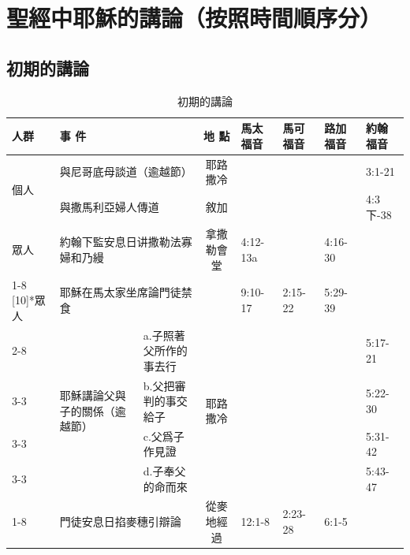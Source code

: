  \section{聖經中耶穌的講論（按照時間順序分）}
 
 \subsection{初期的講論}
 \begin{table}[htbp]
  \centering

    \begin{tabular}{p{2.43em}|p{3.93em}|p{11.53em}|c|p{4.045em}|p{4.045em}|p{4.045em}|p{4.045em}}
    \toprule
    人群    & \multicolumn{2}{p{16.5em}|}{事 件} & 地 點 & 馬太福音 & 馬可福音 & 路加福音 & 約翰福音 \\    \midrule

\multirow{2}{*}{個人} & \multicolumn{2}{p{13.5em}|}{與尼哥底母談道（逾越節）} & 耶路撒冷 &       &       &       & 3:1-21 \\
    
\cmidrule{2-8}       & \multicolumn{2}{p{11.5em}|}{與撒馬利亞婦人傳道} & 敘加 &       &       &       & 4:3下-38 \\ \midrule


\multirow{1}{*}{眾人}&\multicolumn{2}{p{16.5em}|}{約翰下監安息日讲撒勒法寡婦和乃縵} & 拿撒勒會堂 &4:12-13a&&4:16-30&\\\hline

\cmidrule{1-8}   \multirow{6}[10]{*}{眾人} & \multicolumn{2}{p{13.15em}|}{耶穌在馬太家坐席論門徒禁食} &       & 9:10-17 & 2:15-22 & 5:29-39 &  \\

\cmidrule{2-8}          & \multirow{4}{*}{\parbox{0.08\textwidth}{耶穌講論父與子的關係（逾越節）}} & a.子照著父所作的事去行 & \multirow{4}{*}{耶路撒冷} &       &       &       & 5:17-21 \\

\cmidrule{3-3}\cmidrule{5-8}      &       & b.父把審判的事交給子 &       &       &       &       & 5:22-30 \\
\cmidrule{3-3}\cmidrule{5-8}          &       & c.父爲子作見證 &       &       &       &       & 5:31-42 \\
\cmidrule{3-3}\cmidrule{5-8}          &       & d.子奉父的命而來 &       &       &       &       & 5:43-47 \\

\cmidrule{1-8} &\multicolumn{2}{p{12.em}|}{門徒安息日掐麥穗引辯論}&\multirow{1}{*}{從麥地經過} &12:1-8&2:23-28&6:1-5& \\ \bottomrule
    \end{tabular}%
  \label{tab:addlabel}%
    \caption{初期的講論}
\end{table}%
 

